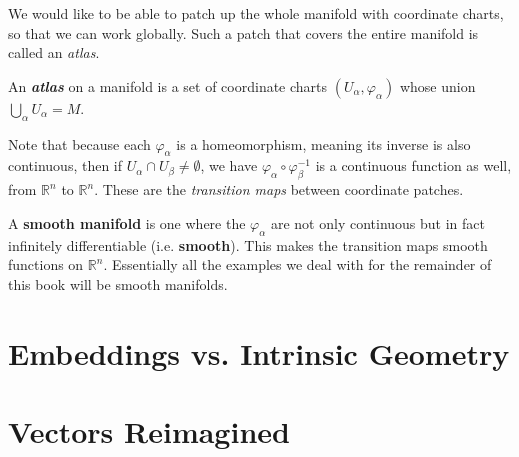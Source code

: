 \documentclass[../master.tex]{subfiles}
\begin{document}
	We would like to be able to patch up the whole manifold with coordinate charts, so that we can work globally. Such a patch that covers the entire manifold is called an \emph{atlas}.
	
	\begin{defn}[Atlas]\label{def:Atlas}
		An \textbf{\emph{atlas}} on a manifold is a set of coordinate charts $(U_\alpha, \varphi_\alpha)$ whose union $\bigcup_\alpha U_\alpha = M$.
	\end{defn}
	
	Note that because each $\varphi_\alpha$ is a homeomorphism, meaning its inverse is also continuous, then if $U_\alpha \cap U_\beta \neq \emptyset$, we have $\varphi_\alpha \circ \varphi_\beta^{-1}$ is a continuous function as well, from $\mathbb{R}^n$ to $\mathbb{R}^n$. These are the \emph{transition maps} between coordinate patches.
	
	A \textbf{smooth manifold} is one where the $\varphi_\alpha$ are not only continuous but in fact infinitely differentiable (i.e. \textbf{smooth}). This makes the transition maps smooth functions on $\mathbb{R}^n$. Essentially all the examples we deal with for the remainder of this book will be smooth manifolds.
	
	
	\section{Embeddings vs. Intrinsic Geometry} %
	\label{sec:embeddings_vs._intrinsic_geometry}
	
	

	
	
	
	\section{Vectors Reimagined} %
	\label{sec:vectors_reimagined}
	
	
\end{document}
